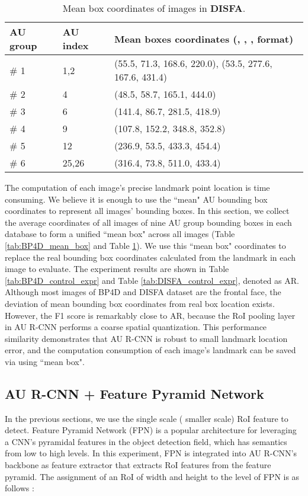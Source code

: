\documentclass[5p,twocolumn]{elsarticle}
\begin{document}
\begin{table}[htp]
	\scriptsize	
	\setlength{\abovecaptionskip}{0pt} 
	\caption{Mean box coordinates of  images in \textbf{DISFA}.}
	\label{tab:DISFA_mean_box}
	\centering
	\tabcolsep=0.05cm
	\begin{tabular}{lll}
		\toprule
		
		AU group & AU index & Mean boxes coordinates (, , ,  format) \\
		\midrule
		\# 1 & 1,2 & (55.5, 71.3, 168.6, 220.0), (53.5, 277.6, 167.6, 431.4)  \\
		\# 2 & 4 & (48.5, 58.7, 165.1, 444.0) \\
		\# 3 & 6 & (141.4, 86.7, 281.5, 418.9) \\
		\# 4 & 9 & (107.8, 152.2, 348.8, 352.8) \\
		\# 5 & 12 & (236.9, 53.5, 433.3, 454.4) \\
		\# 6 & 25,26 & (316.4, 73.8, 511.0, 433.4) \\
		\bottomrule
	\end{tabular}
\end{table}
The computation of each image's precise landmark point location is time consuming. We believe it is enough to use the ``mean" AU bounding box coordinates to represent all images' bounding boxes. In this section, we collect the average coordinates of all images of nine AU group bounding boxes in each database to form a unified ``mean box" across all images (Table \ref{tab:BP4D_mean_box} and Table \ref{tab:DISFA_mean_box}). We use this ``mean box" coordinates to replace the real bounding box coordinates calculated from the landmark in each image to evaluate. The experiment results are shown in Table \ref{tab:BP4D_control_expr} and Table \ref{tab:DISFA_control_expr}, denoted as AR. Although most images of BP4D and DISFA dataset are the frontal face, the deviation of mean bounding box coordinates from real box location exists. However, the F1 score is remarkably close to AR, because the RoI pooling layer in AU R-CNN performs a coarse spatial quantization. This performance similarity demonstrates that AU R-CNN is robust to small landmark location error, and the computation consumption of each image's landmark can be saved via using ``mean box".

\subsection{AU R-CNN + Feature Pyramid Network}
In the previous sections, we use the single scale ( smaller scale) RoI feature to detect. Feature Pyramid Network (FPN) \cite{lin2017feature} is a popular architecture for leveraging a CNN's pyramidal features in the object detection field, which has semantics from low to high levels. In this experiment, FPN is integrated into AU R-CNN's backbone as feature extractor that extracts RoI features from the feature pyramid. The assignment of an RoI of width  and height  to the level  of FPN is as follows \cite{lin2017feature}:
\end{document}
